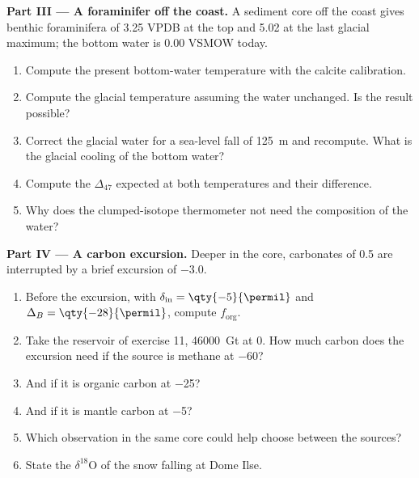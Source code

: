 \begin{problem}
\medskip\noindent\textbf{Part III --- A foraminifer off the coast.} A
sediment core off the coast gives benthic foraminifera of \qty{3.25}{\permil}
VPDB at the top and \qty{5.02}{\permil} at the last glacial maximum; the bottom
water is \qty{0.00}{\permil} VSMOW today.
\begin{enumerate}[resume]
\item Compute the present bottom-water temperature with the calcite
calibration.
\item Compute the glacial temperature assuming the water unchanged. Is the
result possible?
\item Correct the glacial water for a sea-level fall of \qty{125}{m} and
recompute. What is the glacial cooling of the bottom water?
\item Compute the $\Delta_{47}$ expected at both temperatures and their
difference.
\item Why does the clumped-isotope thermometer not need the composition of the
water?
\end{enumerate}

\medskip\noindent\textbf{Part IV --- A carbon excursion.} Deeper in the core,
carbonates of \qty{+0.5}{\permil} are interrupted by a brief excursion of
\qty{-3.0}{\permil}.
\begin{enumerate}[resume]
\item Before the excursion, with $\delta_{\mathrm{in}} = \qty{-5}{\permil}$ and
$\Delta_B = \qty{-28}{\permil}$, compute $f_{\mathrm{org}}$.
\item Take the reservoir of exercise 11, \qty{46000}{Gt} at 0. How much carbon
does the excursion need if the source is methane at \qty{-60}{\permil}?
\item And if it is organic carbon at \qty{-25}{\permil}?
\item And if it is mantle carbon at \qty{-5}{\permil}?
\item Which observation in the same core could help choose between the
sources?
\item State the $\delta^{18}\mathrm O$ of the snow falling at Dome Ilse.
\end{enumerate}
\end{problem}
